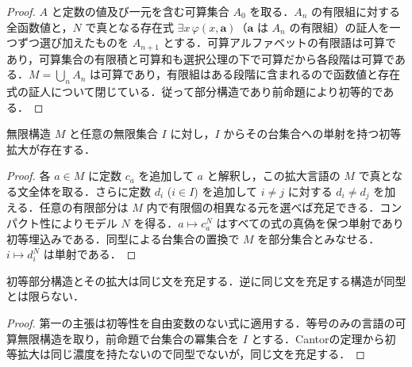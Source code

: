 \begin{proof}
$A$ と定数の値及び一元を含む可算集合 $A_0$ を取る．$A_n$ の有限組に対する全函数値と，$N$ で真となる存在式 $\exists x\,\varphi(x,\boldsymbol a)$（$\boldsymbol a$ は $A_n$ の有限組）の証人を一つずつ選び加えたものを $A_{n+1}$ とする．可算アルファベットの有限語は可算であり，可算集合の有限積と可算和も選択公理の下で可算だから各段階は可算である．$M=\bigcup_n A_n$ は可算であり，有限組はある段階に含まれるので函数値と存在式の証人について閉じている．従って部分構造であり前命題により初等的である．
\end{proof}
\begin{prop}[コンパクト性による初等拡大]
無限構造 $M$ と任意の無限集合 $I$ に対し，$I$ からその台集合への単射を持つ初等拡大が存在する．
\end{prop}
\begin{proof}
各 $a\in M$ に定数 $c_a$ を追加して $a$ と解釈し，この拡大言語の $M$ で真となる文全体を取る．さらに定数 $d_i$ ($i\in I$) を追加して $i\ne j$ に対する $d_i\ne d_j$ を加える．任意の有限部分は $M$ 内で有限個の相異なる元を選べば充足できる．コンパクト性によりモデル $N$ を得る．$a\mapsto c_a^N$ はすべての式の真偽を保つ単射であり初等埋込みである．同型による台集合の置換で $M$ を部分集合とみなせる．$i\mapsto d_i^N$ は単射である．
\end{proof}
\begin{prop}[初等同値と同型]
初等部分構造とその拡大は同じ文を充足する．逆に同じ文を充足する構造が同型とは限らない．
\end{prop}
\begin{proof}
第一の主張は初等性を自由変数のない式に適用する．等号のみの言語の可算無限構造を取り，前命題で台集合の冪集合を $I$ とする．Cantorの定理から初等拡大は同じ濃度を持たないので同型でないが，同じ文を充足する．
\end{proof}
